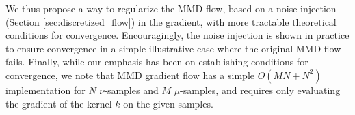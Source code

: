 We thus propose a way to regularize the MMD flow, based on a noise injection (Section \ref{sec:discretized_flow}) in the gradient, with more tractable theoretical conditions for convergence. Encouragingly, the
noise injection is shown in practice to ensure convergence in a simple illustrative case where the original MMD flow fails.
Finally, while our emphasis has been on establishing conditions for convergence, we note that MMD gradient flow has a  simple
$O(MN+N^2)$ implementation for $N$ $\nu$-samples and $M$ $\mu$-samples, and requires only evaluating the gradient of the kernel $k$ on the given samples.


 

 








